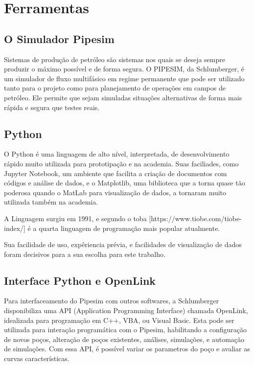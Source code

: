 
\chapter{Ferramentas} \label{chap:4}


\section{O Simulador Pipesim}
Sistemas de produção de petróleo são sistemas nos quais se deseja sempre produzir o máximo possível e de forma segura.
O PIPESIM, da Schlumberger, é um simulador de fluxo multifásico em regime permanente que pode ser utilizado tanto para o projeto como para planejamento de operações em campos de petróleo. Ele permite que sejam simuladas situações alternativas de forma mais rápida e segura que testes reais.

\section{Python}

O Python é uma linguagem de alto nível, interpretada, de desenvolvimento rápido muito utilizada para prototipação e na academia. Suas faciliades, como Jupyter Notebook, um ambiente que facilita a criação de documentos com códigos e análise de dados, e o Matplotlib, uma biblioteca que a torna quase tão poderosa quando o MatLab para visualização de dados, a tornaram muito utilizada também na academia.

A Linguagem surgiu em 1991, e segundo o toba [https://www.tiobe.com/tiobe-index/] é a quarta linguagem de programação mais popular atualmente.

Sua facilidade de uso, expêriencia prévia, e facilidades de visualização de dados foram decisivos para a sua escolha para este trabalho. 

\section{Interface Python e OpenLink}
Para interfaceamento do Pipesim com outros softwares, a Schlumberger disponibiliza uma API (Application Programming Interface) chamada OpenLink, idealizada para programação em C++, VBA, ou Visual Basic. Esta pode ser utilizada para interação programática com o Pipesim, habilitando a configuração de novos poços, alteração de poços existentes, análises, simulações, e automação de simulações. Com essa API, é possível variar os parametros do poço e avaliar as curvas características.

